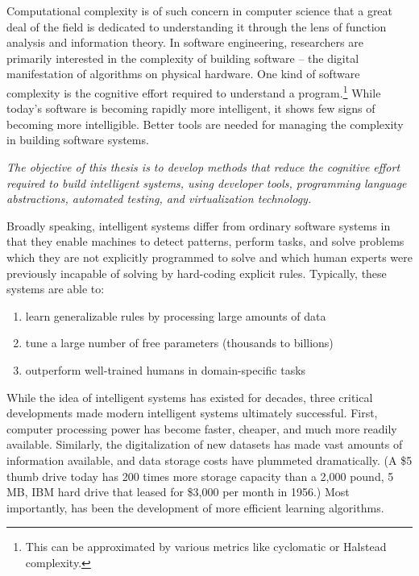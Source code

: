 \documentclass[12pt,initial,twoside,maitrise]{dms}
\numberwithin{equation}{section}
\numberwithin{table}{chapter}
\numberwithin{figure}{chapter}
\begin{document}
Computational complexity is of such concern in computer science that a great deal of the field is dedicated to understanding it through the lens of function analysis and information theory. In software engineering, researchers are primarily interested in the complexity of building software -- the digital manifestation of algorithms on physical hardware. One kind of software complexity is the cognitive effort required to understand a program.\footnote{This can be approximated by various metrics like cyclomatic or Halstead complexity.} While today's software is becoming rapidly more intelligent, it shows few signs of becoming more intelligible. Better tools are needed for managing the complexity in building software systems.

\textit{The objective of this thesis is to develop methods that reduce the cognitive effort required to build intelligent systems, using developer tools, programming language abstractions, automated testing, and virtualization technology.}

Broadly speaking, intelligent systems differ from ordinary software systems in that they enable machines to detect patterns, perform tasks, and solve problems which they are not explicitly programmed to solve and which human experts were previously incapable of solving by hard-coding explicit rules. Typically, these systems are able to:\\
%
\begin{enumerate}
    \item learn generalizable rules by processing large amounts of data
    \item tune a large number of free parameters (thousands to billions)
    \item outperform well-trained humans in domain-specific tasks
\end{enumerate}
%
While the idea of intelligent systems has existed for decades, three critical developments made modern intelligent systems ultimately successful. First, computer processing power has become faster, cheaper, and much more readily available. Similarly, the digitalization of new datasets has made vast amounts of information available, and data storage costs have plummeted dramatically. (A \$5 thumb drive today has 200 times more storage capacity than a 2,000 pound, 5 MB, IBM hard drive that leased for \$3,000 per month in 1956.) Most importantly, has been the development of more efficient learning algorithms.
\end{document}
